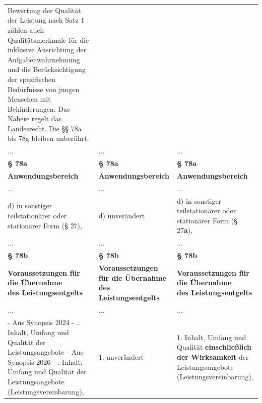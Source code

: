 \documentclass[10pt,a4paper,landscape]{article}
\begin{document}
\begin{longtable}{|L{8.2cm}|L{8.2cm}|L{8.2cm}|}
Bewertung der  \newline Qualität der Leistung nach Satz 1 zählen  \newline auch Qualitätsmerkmale für die inklusive  \newline Ausrichtung der Aufgabenwahrnehmung  \newline und die Berücksichtigung der spezifischen  \newline Bedürfnisse von jungen Menschen mit  \newline Behinderungen. Das Nähere regelt das  \newline Landesrecht. Die \S{}\S{} 78a bis 78g bleiben  \newline unberührt. \\
\hhline{|---|}
... & ... & ... \\
\hhline{|---|}
\textbf{\S{} 78a} & \textbf{\S{} 78a} & \textbf{\S{} 78a} \\
\hhline{|---|}
\textbf{Anwendungsbereich} & \textbf{Anwendungsbereich} & \textbf{Anwendungsbereich} \\
\hhline{|---|}
... & ... & ... \\
\hhline{|---|}
d)  \newline in sonstiger teilstationärer oder stationärer  \newline Form (\S{} \textcolor{diffred}{27),} & d) unverändert & d)  in sonstiger teilstationärer oder stationärer  \newline Form (\S{} \textcolor{diffgreen}{27}\textbf{\textcolor{diffgreen}{a}}\textcolor{diffgreen}{),} \\
\hhline{|---|}
... & ... & ... \\
\hhline{|---|}
\textbf{\S{} 78b} & \textbf{\S{} 78b} & \textbf{\S{} 78b} \\
\hhline{|---|}
\textbf{Voraussetzungen für die Übernahme  \newline des Leistungsentgelts} & \textbf{Voraussetzungen für die Übernahme  \newline des Leistungsentgelts} & \textbf{Voraussetzungen für die Übernahme  \newline des Leistungsentgelts} \\
\hhline{|---|}
... & ... & ... \\
\hhline{|---|}
- Aus Synopsis 2024 - .  \newline Inhalt, Umfang und Qualität der  \newline Leistungsangebote  \newline - Aus Synopsis 2026 - .  \newline Inhalt, Umfang und Qualität der  \newline Leistungsangebote  \newline (Leistungsvereinbarung), & 1. unverändert & 1.  \newline Inhalt, Umfang und Qualität \textbf{\textcolor{diffgreen}{einschließlich  \newline der Wirksamkeit}} der Leistungsangebote  \newline (Leistungsvereinbarung), \\

\end{longtable}
\end{document}

